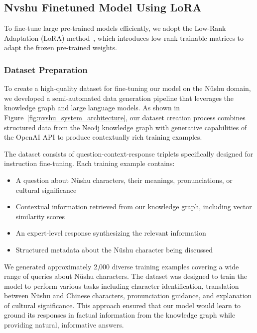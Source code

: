 \documentclass{article}
\begin{document}
\subsection{Nvshu Finetuned Model Using LoRA}
\label{ssec:nvshu_lora}
To fine-tune large pre-trained models efficiently, we adopt the Low-Rank Adaptation (LoRA) method~\cite{huLoRALowRankAdaptation2021}, which introduces low-rank trainable matrices to adapt the frozen pre-trained weights.

\subsubsection{Dataset Preparation}
\label{sssec:dataset_preparation}

To create a high-quality dataset for fine-tuning our model on the N\"{u}shu domain, we developed a semi-automated data generation pipeline that leverages the knowledge graph and large language models. As shown in Figure~\ref{fig:nvshu_system_architecture}, our dataset creation process combines structured data from the Neo4j knowledge graph with generative capabilities of the OpenAI API to produce contextually rich training examples.

The dataset consists of question-context-response triplets specifically designed for instruction fine-tuning. Each training example contains:

\begin{itemize}
    \item A question about N\"{u}shu characters, their meanings, pronunciations, or cultural significance
    \item Contextual information retrieved from our knowledge graph, including vector similarity scores
    \item An expert-level response synthesizing the relevant information
    \item Structured metadata about the N\"{u}shu character being discussed
\end{itemize}

We generated approximately 2,000 diverse training examples covering a wide range of queries about N\"{u}shu characters. The dataset was designed to train the model to perform various tasks including character identification, translation between N\"{u}shu and Chinese characters, pronunciation guidance, and explanation of cultural significance. This approach ensured that our model would learn to ground its responses in factual information from the knowledge graph while providing natural, informative answers.
\end{document}
